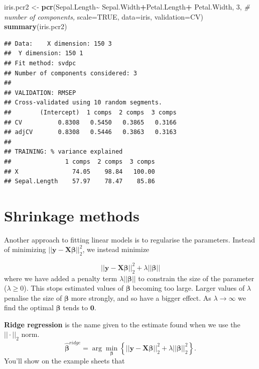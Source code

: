 \documentclass[
]{book}
\newenvironment{Shaded}{\begin{snugshade}}{\end{snugshade}}
\newcommand{\AttributeTok}[1]{\textcolor[rgb]{0.13,0.29,0.53}{#1}}
\newcommand{\CommentTok}[1]{\textcolor[rgb]{0.56,0.35,0.01}{\textit{#1}}}
\newcommand{\ConstantTok}[1]{\textcolor[rgb]{0.56,0.35,0.01}{#1}}
\newcommand{\DecValTok}[1]{\textcolor[rgb]{0.00,0.00,0.81}{#1}}
\newcommand{\FunctionTok}[1]{\textcolor[rgb]{0.13,0.29,0.53}{\textbf{#1}}}
\newcommand{\NormalTok}[1]{#1}
\newcommand{\OtherTok}[1]{\textcolor[rgb]{0.56,0.35,0.01}{#1}}
\newcommand{\SpecialCharTok}[1]{\textcolor[rgb]{0.81,0.36,0.00}{\textbf{#1}}}
\newcommand{\StringTok}[1]{\textcolor[rgb]{0.31,0.60,0.02}{#1}}
\theoremstyle{definition}
\theoremstyle{definition}
\theoremstyle{definition}
\theoremstyle{definition}
\theoremstyle{remark}
\begin{document}
\begin{Shaded}
\begin{Highlighting}[]
\NormalTok{iris.pcr2 }\OtherTok{\textless{}{-}} \FunctionTok{pcr}\NormalTok{(Sepal.Length}\SpecialCharTok{\textasciitilde{}}\NormalTok{ Sepal.Width}\SpecialCharTok{+}\NormalTok{Petal.Length}\SpecialCharTok{+}
\NormalTok{                   Petal.Width, }\DecValTok{3}\NormalTok{, }\CommentTok{\# number of components,}
                \AttributeTok{scale=}\ConstantTok{TRUE}\NormalTok{, }\AttributeTok{data=}\NormalTok{iris, }\AttributeTok{validation=}\StringTok{\textquotesingle{}CV\textquotesingle{}}\NormalTok{)}
\FunctionTok{summary}\NormalTok{(iris.pcr2)}
\end{Highlighting}
\end{Shaded}

\begin{verbatim}
## Data:    X dimension: 150 3 
##  Y dimension: 150 1
## Fit method: svdpc
## Number of components considered: 3
## 
## VALIDATION: RMSEP
## Cross-validated using 10 random segments.
##        (Intercept)  1 comps  2 comps  3 comps
## CV          0.8308   0.5450   0.3865   0.3166
## adjCV       0.8308   0.5446   0.3863   0.3163
## 
## TRAINING: % variance explained
##               1 comps  2 comps  3 comps
## X               74.05    98.84   100.00
## Sepal.Length    57.97    78.47    85.86
\end{verbatim}

\hypertarget{shrinkage-methods}{%
\section{Shrinkage methods}\label{shrinkage-methods}}

Another approach to fitting linear models is to regularise the parameters. Instead of minimizing \(||\mathbf y- \mathbf X\boldsymbol \beta||^2_2\), we instead minimize

\[||\mathbf y- \mathbf X\boldsymbol \beta||^2_2+\lambda||\boldsymbol \beta||\]
where we have added a penalty term \(\lambda||\boldsymbol \beta||\) to constrain the size of the parameter (\(\lambda\geq 0\)). This stops estimated values of \(\boldsymbol \beta\) becoming too large.
Larger values of \(\lambda\) penalise the size of \(\boldsymbol \beta\) more strongly, and so have a bigger effect. As \(\lambda \rightarrow \infty\) we find the optimal \(\boldsymbol \beta\) tends to \({\boldsymbol 0}\).

\textbf{Ridge regression} is the name given to the estimate found when we use the \(||\cdot||_2\) norm.
\[\hat{\boldsymbol \beta}^{ridge} = \arg \min_{\boldsymbol \beta} \left\{||\mathbf y- \mathbf X\boldsymbol \beta||^2_2+\lambda||\boldsymbol \beta||_2^2 \right\}.\]
You'll show on the example sheets that
\end{document}
